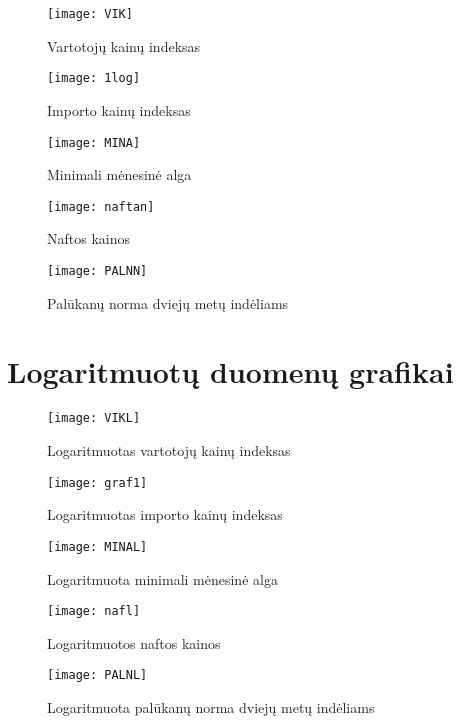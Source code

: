 \documentclass[a4paper]{article}
\begin{document}
\begin{figure}[H]
\centering 
\texttt{[image: VIK]}
\caption{Vartotojų kainų indeksas}
\end{figure}

\begin{figure}[H]
\centering 
\texttt{[image: 1log]}
\caption{Importo kainų indeksas}
\end{figure}

\begin{figure}[H]
\centering 
\texttt{[image: MINA]}
\caption{Minimali mėnesinė alga}
\end{figure}

\begin{figure}[H]
\centering 
\texttt{[image: naftan]}
\caption{Naftos kainos}
\end{figure}

\begin{figure}[H]
\centering 
\texttt{[image: PALNN]}
\caption{Palūkanų norma dviejų metų indėliams}
\end{figure}
\newpage
\section{Logaritmuotų duomenų grafikai}
\begin{figure}[H]
\centering 
\texttt{[image: VIKL]}
\caption{Logaritmuotas vartotojų kainų indeksas}
\end{figure}

\begin{figure}[H]
\centering 
\texttt{[image: graf1]}
\caption{Logaritmuotas importo kainų indeksas}
\end{figure}


\begin{figure}[H]
\centering 
\texttt{[image: MINAL]}
\caption{Logaritmuota minimali mėnesinė alga}
\end{figure}


\begin{figure}[H]
\centering 
\texttt{[image: nafl]}
\caption{Logaritmuotos naftos kainos}
\end{figure}

\begin{figure}[H]
\centering 
\texttt{[image: PALNL]}
\caption{Logaritmuota palūkanų norma dviejų metų indėliams}
\end{figure}
\end{document}

